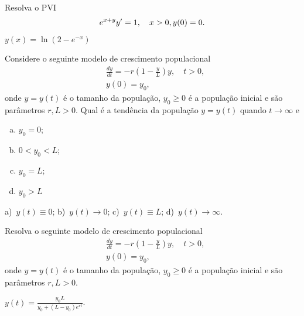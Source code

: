 \begin{exer}
  Resolva o PVI
  \begin{equation}
    e^{x+y}y' = 1,\quad x>0,\\
    y(0) = 0.
  \end{equation}
\end{exer}
\begin{resp}
  $y(x) = \ln\left(2 - e^{-x}\right)$
\end{resp}

\begin{exer}
  Considere o seguinte modelo de crescimento populacional
  \begin{align*}
    &\frac{dy}{dt} = -r\left(1 - \frac{y}{L}\right)y,\quad t>0,\\
    &y(0) = y_0,
  \end{align*}
  onde $y = y(t)$ é o tamanho da população, $y_0 \geq 0$ é a população inicial e são parâmetros $r, L > 0$. Qual é a tendência da população $y = y(t)$ quando $t\to\infty$ e
  \begin{enumerate}[a)]
  \item $y_0 = 0$;
  \item $0 < y_0 < L$;
  \item $y_0 = L$;
  \item $y_0 > L$
  \end{enumerate}
\end{exer}
\begin{resp}
  a)~$y(t) \equiv 0$; b)~$y(t)\to 0$; c)~$y(t)\equiv L$; d)~$y(t)\to\infty$.
\end{resp}

\begin{exer}
  Resolva o seguinte modelo de crescimento populacional
  \begin{align*}
    &\frac{dy}{dt} = -r\left(1 - \frac{y}{L}\right)y,\quad t>0,\\
    &y(0) = y_0,
  \end{align*}
  onde $y = y(t)$ é o tamanho da população, $y_0 \geq 0$ é a população inicial e são parâmetros $r, L > 0$.
\end{exer}
\begin{resp}
  $\displaystyle y(t) = \frac{y_0L}{y_0 + (L-y_0)e^{rt}}$.
\end{resp}

